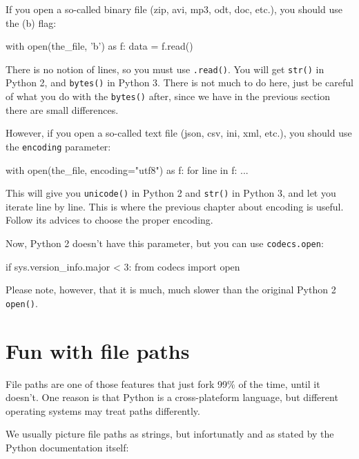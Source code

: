 If you open a so-called binary file (zip, avi, mp3, odt, doc, etc.), you should use the \textquote(b) flag:

\begin{py2and3}
with open(the_file, 'b') as f:
    data = f.read()
\end{py2and3}

There is no notion of lines, so you must use \lstinline{.read()}. You will get \lstinline{str()} in Python 2, and \lstinline{bytes()} in Python 3. There is not much to do here, just be careful of what you do with the \lstinline{bytes()} after, since we have in the previous section there are small differences.

However, if you open a so-called text file (json, csv, ini, xml, etc.), you should use the \lstinline{encoding} parameter:

\begin{py3}
with open(the_file, encoding="utf8") as f:
    for line in f:
        ...
\end{py3}

This will give you \lstinline{unicode()} in Python 2 and \lstinline{str()} in Python 3, and let you iterate line by line. This is where the previous chapter about encoding is useful. Follow its advices to choose the proper encoding.

Now, Python 2 doesn't have this parameter, but you can use \lstinline{codecs.open}:

\begin{py2and3}
if sys.version_info.major < 3:
    from codecs import open
\end{py2and3}

Please note, however, that it is much, much slower than the original Python 2 \lstinline{open()}.

\section{Fun with file paths}

File paths are one of those features that just fork 99\% of the time, until it doesn't. One reason is that Python is a cross-plateform language, but different operating systems may treat paths differently.

We usually picture file paths as strings, but infortunatly and as stated by the Python documentation itself: 

